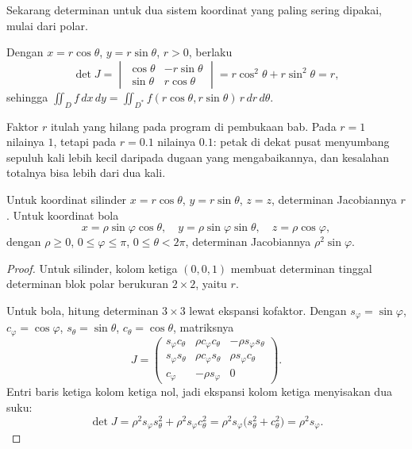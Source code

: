 Sekarang determinan untuk dua sistem koordinat yang paling sering dipakai,
mulai dari polar.

\begin{proposisi}
Dengan $x=r\cos\theta$, $y=r\sin\theta$, $r>0$, berlaku
\[
\det J=\begin{vmatrix}\cos\theta & -r\sin\theta\\ \sin\theta & r\cos\theta
\end{vmatrix}=r\cos^{2}\theta+r\sin^{2}\theta=r ,
\]
sehingga
$\iint_{D}f\,dx\,dy=\iint_{D^{*}}f(r\cos\theta,r\sin\theta)\,r\,dr\,d\theta$.
\end{proposisi}

Faktor $r$ itulah yang hilang pada program di pembukaan bab. Pada $r=1$
nilainya $1$, tetapi pada $r=0.1$ nilainya $0.1$: petak di dekat pusat
menyumbang sepuluh kali lebih kecil daripada dugaan yang mengabaikannya, dan
kesalahan totalnya bisa lebih dari dua kali.

\begin{proposisi}
 Untuk koordinat silinder
$x=r\cos\theta$, $y=r\sin\theta$, $z=z$, determinan Jacobiannya $r$. Untuk
koordinat bola
\[
x=\rho\sin\varphi\cos\theta,\quad
y=\rho\sin\varphi\sin\theta,\quad
z=\rho\cos\varphi ,
\]
dengan $\rho\ge0$, $0\le\varphi\le\pi$, $0\le\theta<2\pi$, determinan
Jacobiannya $\rho^{2}\sin\varphi$.
\end{proposisi}

\begin{proof}
Untuk silinder, kolom ketiga $(0,0,1)$ membuat determinan tinggal determinan
blok polar berukuran $2\times2$, yaitu $r$.

Untuk bola, hitung determinan $3\times3$ lewat ekspansi kofaktor. Dengan
$s_{\varphi}=\sin\varphi$, $c_{\varphi}=\cos\varphi$,
$s_{\theta}=\sin\theta$, $c_{\theta}=\cos\theta$, matriksnya
\[
J=\begin{pmatrix}
s_{\varphi}c_{\theta} & \rho c_{\varphi}c_{\theta} & -\rho s_{\varphi}s_{\theta}\\
s_{\varphi}s_{\theta} & \rho c_{\varphi}s_{\theta} & \rho s_{\varphi}c_{\theta}\\
c_{\varphi} & -\rho s_{\varphi} & 0
\end{pmatrix}.
\]
Entri baris ketiga kolom ketiga nol, jadi ekspansi kolom ketiga menyisakan dua
suku:
\[
\det J=\rho^{2}s_{\varphi}s_{\theta}^{2}+\rho^{2}s_{\varphi}c_{\theta}^{2}
=\rho^{2}s_{\varphi}\bigl(s_{\theta}^{2}+c_{\theta}^{2}\bigr)=\rho^{2}s_{\varphi}.
\]
\end{proof}

